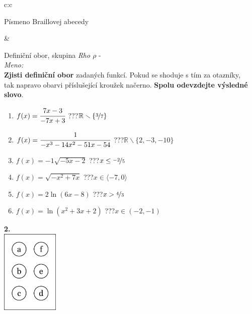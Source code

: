 \documentclass[10pt]{report}
\begin{document}
\begin{tabular}{c:c}
\begin{minipage}[c][99mm][t]{0.49\linewidth}
\begin{center}
\begin{minipage}{0.20\linewidth}
\begin{center}
{\small Písmeno Braillovej abecedy}
\end{center}
\end{minipage}
\end{center}
\end{minipage}
&
\begin{minipage}[c][99mm][t]{0.49\linewidth}
\begin{center}
\vspace{7mm}
{\huge Definiční obor, skupina \textit{Rho $\rho$} -}\\[4.5mm]
\textit{Meno:}\phantom{xxxxxxxxxxxxxxxxxxxxxxxxxxxxxxxxxxxxxxxxxxxxxxxxxxxxxxxxxxxxxxxxx}\\[3.5mm]
\textbf{Zjisti definiční obor} zadaných funkcí. Pokud se shoduje s tím za otazníky,\\tak napravo obarvi příslušející kroužek načerno. \textbf{Spolu odevzdejte výsledné slovo}.\\[3mm]
\begin{minipage}{0.77\linewidth}
\begin{center}
\begin{varwidth}{\textwidth}
\begin{enumerate}
\normalsize
\item $f(x)=\cfrac{7x-3}{-7x+3}$\quad \dotfill\; ???\;\dotfill \quad $\mathbb{R}\smallsetminus\{\nicefrac{3}{7}\}$
\item $f(x)=\cfrac{1}{-x^3-14x^2-51x-54}$\quad \dotfill\; ???\;\dotfill \quad $\mathbb{R}\smallsetminus\{2,-3,-10\}$
\item $f(x)=-1\sqrt{-5x-2}$\quad \dotfill\; ???\;\dotfill \quad $x\leq\nicefrac{-2}{5}$
\item $f(x)=\sqrt{-x^2+7x}$\quad \dotfill\; ???\;\dotfill \quad $x\in\langle-7 , 0\rangle$
\item $f(x)=2\ln{(6x-8)}$\quad \dotfill\; ???\;\dotfill \quad $x>\nicefrac{4}{3}$
\item $f(x)=\ln{(x^2+3x+2)}$\quad \dotfill\; ???\;\dotfill \quad $x\in(-2 , -1)$
\end{enumerate}
\end{varwidth}
\end{center}
\end{minipage}
\begin{minipage}{0.20\linewidth}
\begin{center}
{\Huge\bfseries 2.} \\[2mm]
\includegraphics[height=40mm]{../images/braille.png}

\end{center}
\end{minipage}
\end{center}
\end{minipage}
\end{tabular}
\end{document}
